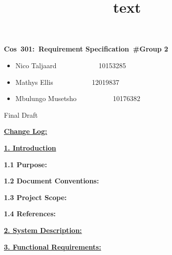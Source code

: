 \documentclass[12pt]{article}
\newcommand{\Title}{Requirement Specification\ \#Group 2} %
\newcommand{\Class}{Cos\ 301} %
\begin{document}
\title{text}
	\vspace{2in}
	\hspace{1.2in}
	\textmd{\textbf{\Class:\ \Title}}\\
	\vspace{2in}


\begin{itemize} %
	\item Nico Taljaard \ ~~~~~~~~~ \ 10153285
	\item Mathys Ellis \ ~~~~~~~~ \ 12019837
	\item Mbulungo Musetsho\ ~~~~~~~~ \ 10176382
\end{itemize}

\vspace{2in}
\hspace{2.5in} 
	Final Draft

\newpage
	\textbf{\underline{Change Log:}}
	
	
	
\newpage
	\textbf{\underline{1. Introduction}}
	
	\vspace{0.2in}

		\textbf{1.1 Purpose:} %
		\vspace{0.1in}
		
	
	\vspace{0.2in}
	
		\textbf{1.2 Document Conventions:} %
		\vspace{0.1in}
		
	
	\vspace{0.2in}
	
		\textbf{1.3 Project Scope:}
		\vspace{0.1in}
		
		
	
	\vspace{0.2in}
	
		\textbf{1.4 References:}
		\vspace{0.1in}
			
	
	\vspace{0.5in}
	
	\textbf{\underline{2. System Description:}}
	\vspace{0.2in}
	
	
	
	\vspace{0.5in}
	
	\newpage
	\textbf{\underline{3. Functional Requirements:}}
	\vspace{0.2in}
		
\end{document}
